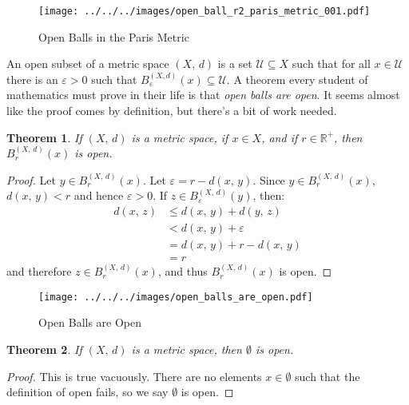 \documentclass{article}
\theoremstyle{plain}
\newtheorem{theorem}{Theorem}[section]
\theoremstyle{normal}
\newenvironment{definition}{%
    \pushQED{\qed}\renewcommand{\qedsymbol}{$\blacksquare$}\definitionx%
}{%
    \popQED\enddefinitionx%
}
\begin{document}
        \begin{figure}
            \centering
            \texttt{[image: ../../../images/open\_ball\_r2\_paris\_metric\_001.pdf]}
            \caption{Open Balls in the Paris Metric}
            \label{fig:open_ball_r2_paris_metric_001}
        \end{figure}
        \begin{definition}[\textbf{Open Subsets}]
            An open subset of a metric space $(X,\,d)$ is a set
            $\mathcal{U}\subseteq{X}$ such that for all
            $x\in\mathcal{U}$ there is an $\varepsilon>0$ such that
            $B_{\varepsilon}^{(X,d)}(x)\subseteq\mathcal{U}$.
        \end{definition}
        A theorem every student of mathematics must prove in their life
        is that \textit{open balls are open}. It seems almost like the proof
        comes by definition, but there's a bit of work needed.
        \begin{theorem}
            If $(X,\,d)$ is a metric space, if $x\in{X}$, and if
            $r\in\mathbb{R}^{+}$, then $B_{r}^{(X,\,d)}(x)$ is open.
        \end{theorem}
        \begin{proof}
            Let $y\in{B}_{r}^{(X,\,d)}(x)$. Let
            $\varepsilon=r-d(x,\,y)$. Since
            $y\in{B}_{r}^{(X,\,d)}(x)$, $d(x,\,y)<r$ and hence
            $\varepsilon>0$. If
            $z\in{B}_{\varepsilon}^{(X,\,d)}(y)$, then:
            \begin{align}
                d(x,\,z)&\leq{d}(x,\,y)+d(y,\,z)\\
                    &<d(x,\,y)+\varepsilon\\
                    &=d(x,\,y)+r-d(x,\,y)\\
                    &=r
            \end{align}
            and therefore $z\in{B}_{r}^{(X,\,d)}(x)$, and thus
            $B_{r}^{(X,\,d)}(x)$ is open.
        \end{proof}
        \begin{figure}
            \centering
            \texttt{[image: ../../../images/open\_balls\_are\_open.pdf]}
            \caption{Open Balls are Open}
            \label{fig:open_balls_are_open}
        \end{figure}
        \begin{theorem}
            If $(X,\,d)$ is a metric space, then $\emptyset$ is open.
        \end{theorem}
        \begin{proof}
            This is true vacuously. There are no elements
            $x\in\emptyset$ such that the definition of open fails, so
            we say $\emptyset$ is open.
        \end{proof}
\end{document}
